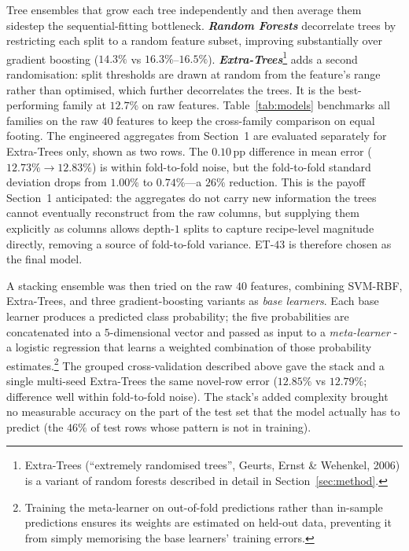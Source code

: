 \documentclass[11pt,a4paper]{article}
\begin{document}
Tree ensembles that grow each tree independently and then average them sidestep the
sequential-fitting bottleneck. \textbf{\textit{Random Forests}} decorrelate trees by
restricting each split to a random feature subset, improving substantially over gradient
boosting ($14.3\%$ vs $16.3\%$--$16.5\%$). \textbf{\textit{Extra-Trees}}\footnote{Extra-Trees
(``extremely randomised trees'', Geurts, Ernst \& Wehenkel, 2006) is a variant of random
forests described in detail in Section~\ref{sec:method}.} adds a second randomisation:
split thresholds are drawn at random from the feature's range rather than optimised, which
further decorrelates the trees. It is the best-performing family at $12.7\%$ on raw features.
Table~\ref{tab:models} benchmarks all families on the raw $40$ features to keep the
cross-family comparison on equal footing. The engineered aggregates from Section~1 are
evaluated separately for Extra-Trees only, shown as two rows. The $0.10$\,pp difference
in mean error ($12.73\%\to12.83\%$) is within fold-to-fold noise, but the fold-to-fold
standard deviation drops from $1.00\%$ to $0.74\%$---a $26\%$ reduction. This is the
payoff Section~1 anticipated: the aggregates do not carry new information the trees
cannot eventually reconstruct from the raw columns, but supplying them explicitly as
columns allows depth-$1$ splits to capture recipe-level magnitude directly, removing a
source of fold-to-fold variance. ET-$43$ is therefore chosen as the final model.

A stacking ensemble was then tried on the raw $40$ features, combining SVM-RBF,
Extra-Trees, and three gradient-boosting variants as \emph{base learners}. Each base learner
produces a predicted class probability; the five probabilities are concatenated into a
$5$-dimensional vector and passed as input to a \emph{meta-learner} - a logistic regression
that learns a weighted combination of those probability estimates.\footnote{Training the meta-learner on out-of-fold
predictions rather than in-sample predictions ensures its weights are estimated on held-out
data, preventing it from simply memorising the base learners' training errors.} The grouped cross-validation described above gave the
stack and a single multi-seed Extra-Trees the same novel-row error ($12.85\%$ vs
$12.79\%$; difference well within fold-to-fold noise). The stack's added complexity brought no measurable accuracy on the part of the test set
that the model actually has to predict (the $46\%$ of test rows whose pattern is not in
training).
\end{document}
